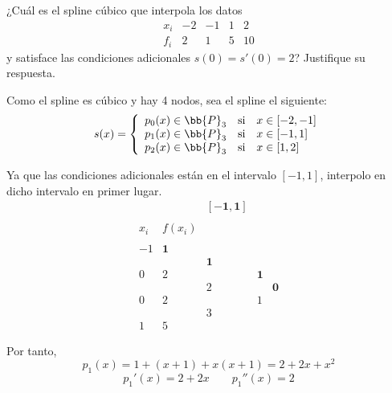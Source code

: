 \begin{ejercicio}
    ¿Cuál es el spline cúbico que interpola los datos
    \begin{equation*}
        \begin{array}{c|cccc}
            x_i & -2 & -1 & 1 & 2 \\ \hline
            f_i & 2 & 1 & 5 & 10
        \end{array}
    \end{equation*}
    y satisface las condiciones adicionales $s(0) = s'(0) = 2$? Justifique su respuesta.

    Como el spline es cúbico y hay 4 nodos, sea el spline el siguiente:
    \begin{equation*}
        s(x)=\left\{\begin{array}{ccl}
            p_0(x)\in \bb{P}_3 & \text{si} & x\in [-2, -1] \\
            p_{1}(x)\in \bb{P}_3 & \text{si} & x\in [-1, 1] \\
            p_{2}(x)\in \bb{P}_3 & \text{si} & x\in [1,2] \\
        \end{array} \right.
    \end{equation*}

    Ya que las condiciones adicionales están en el intervalo $[-1, 1]$, interpolo en dicho intervalo en primer lugar.
    \begin{equation*}
        \begin{array}{c|cccc}
            &&\mathbf{[-1,1]} \\ \\
            x_i & f(x_i) \\ \\
            -1 & \mathbf{1} \\
            && \mathbf{1}\\
            0 & 2 && \mathbf{1}\\
            && 2 && \mathbf{0}\\ 
            0 & 2 && 1\\
            && 3\\
            1 & 5
        \end{array}
    \end{equation*}

    Por tanto,
    \begin{equation*}
        p_1(x)=1+(x+1)+x(x+1)=2+2x+x^2
    \end{equation*}
    \begin{equation*}
    p_1'(x)=2+2x
    \qquad
    p_1''(x)=2
    \end{equation*}


\end{ejercicio}

